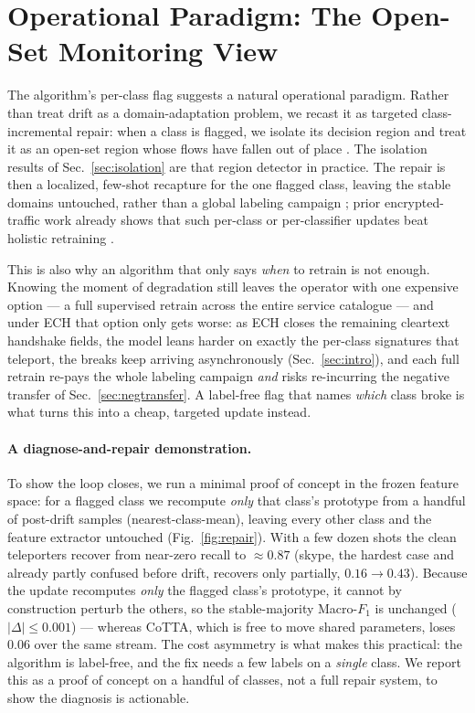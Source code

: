 \section{Operational Paradigm: The Open-Set Monitoring View}
\label{sec:operational}
The algorithm's per-class flag suggests a natural operational paradigm. Rather than
treat drift as a domain-adaptation problem, we recast it as targeted
class-incremental repair: when a class is flagged, we isolate its decision region
and treat it as an open-set region whose flows have fallen out of place
\cite{bendale2016openmax}. The isolation results of Sec.~\ref{sec:isolation} are
that region detector in practice. The repair is then a localized, few-shot
recapture for the one flagged class, leaving the stable domains untouched, rather
than a global labeling campaign
\cite{tao2020fscil,rebuffi2017icarl,kirkpatrick2017ewc,li2017lwf,shahraki2022active};
prior encrypted-traffic work already shows that such per-class or per-classifier
updates beat holistic retraining \cite{deng2023ares,deng2024holmes}.

This is also why an algorithm that only says \emph{when} to retrain is not enough.
Knowing the moment of degradation still leaves the operator with one expensive
option --- a full supervised retrain across the entire service catalogue --- and
under ECH that option only gets worse: as ECH closes the remaining cleartext
handshake fields, the model leans harder on exactly the per-class signatures that
teleport, the breaks keep arriving asynchronously (Sec.~\ref{sec:intro}), and each
full retrain re-pays the whole labeling campaign \emph{and} risks re-incurring the
negative transfer of Sec.~\ref{sec:negtransfer}. A label-free flag that names
\emph{which} class broke is what turns this into a cheap, targeted update instead.

\paragraph{A diagnose-and-repair demonstration.} To show the loop closes, we run
a minimal proof of concept in the frozen feature space: for a flagged class we
recompute \emph{only} that class's prototype from a handful of post-drift samples
(nearest-class-mean), leaving every other class and the feature extractor
untouched (Fig.~\ref{fig:repair}). With a few dozen shots the clean teleporters
recover from near-zero recall to $\approx0.87$ (skype, the hardest case and
already partly confused before drift, recovers only partially, $0.16\to0.43$).
Because the update recomputes \emph{only} the flagged class's prototype, it cannot
by construction perturb the others, so the stable-majority Macro-$F_1$ is
unchanged ($|\Delta|\le0.001$) --- whereas CoTTA, which is free to move shared
parameters, loses $0.06$ over the same stream. The cost asymmetry is what makes
this practical: the algorithm is label-free, and the fix needs a few labels on a
\emph{single} class. We report this as a proof of concept on a handful of classes,
not a full repair system, to show the diagnosis is actionable.

